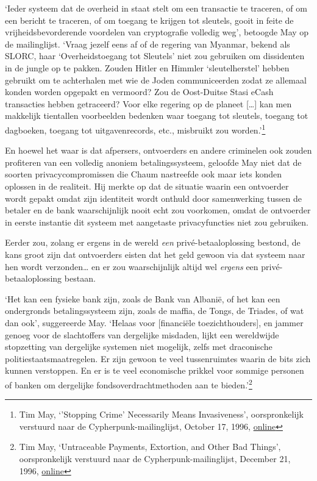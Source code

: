 \documentclass[
  a5paper,
  smalldemyvopaper,11pt,twoside,onecolumn,openright,extrafontsizes,
hidelinks]{memoir}
\begin{document}
`Ieder systeem dat de overheid in staat stelt om een transactie te
traceren, of om een bericht te traceren, of om toegang te krijgen tot
sleutels, gooit in feite de vrijheidsbevorderende voordelen van
cryptografie volledig weg', betoogde May op de mailinglijst. `Vraag
jezelf eens af of de regering van Myanmar, bekend als SLORC, haar
`Overheidstoegang tot Sleutels' niet zou gebruiken om dissidenten in de
jungle op te pakken. Zouden Hitler en Himmler `sleutelherstel' hebben
gebruikt om te achterhalen met wie de Joden communiceerden zodat ze
allemaal konden worden opgepakt en vermoord? Zou de Oost-Duitse Stasi
eCash transacties hebben getraceerd? Voor elke regering op de planeet
{[}\ldots{]} kan men makkelijk tientallen voorbeelden bedenken waar
toegang tot sleutels, toegang tot dagboeken, toegang tot
uitgavenrecords, etc., misbruikt zou worden.'\footnote{Tim May,
  `'Stopping Crime' Necessarily Means Invasiveness', oorspronkelijk
  verstuurd naar de Cypherpunk-mailinglijst, October 17, 1996,
  \href{https://cypherpunks.venona.com/date/1996/10/msg01269.html}{online}}

En hoewel het waar is dat afpersers, ontvoerders en andere criminelen
ook zouden profiteren van een volledig anoniem betalingssysteem,
geloofde May niet dat de soorten privacycompromissen die Chaum
nastreefde ook maar iets konden oplossen in de realiteit. Hij merkte op
dat de situatie waarin een ontvoerder wordt gepakt omdat zijn identiteit
wordt onthuld door samenwerking tussen de betaler en de bank
waarschijnlijk nooit echt zou voorkomen, omdat de ontvoerder in eerste
instantie dit systeem met aangetaste privacyfuncties niet zou gebruiken.

Eerder zou, zolang er ergens in de wereld \emph{een}
privé-betaaloplossing bestond, de kans groot zijn dat ontvoerders eisten
dat het geld gewoon via dat systeem naar hen wordt verzonden\ldots{} en
er zou waarschijnlijk altijd wel \emph{ergens} een privé-betaaloplossing
bestaan.

`Het kan een fysieke bank zijn, zoals de Bank van Albanië, of het kan
een ondergronds betalingssysteem zijn, zoals de maffia, de Tongs, de
Triades, of wat dan ook', suggereerde May. `Helaas voor {[}financiële
toezichthouders{]}, en jammer genoeg voor de slachtoffers van dergelijke
misdaden, lijkt een wereldwijde stopzetting van dergelijke systemen niet
mogelijk, zelfs met draconische politiestaatsmaatregelen. Er zijn gewoon
te veel tussenruimtes waarin de bits zich kunnen verstoppen. En er is te
veel economische prikkel voor sommige personen of banken om dergelijke
fondsoverdrachtmethoden aan te bieden.'\footnote{Tim May, `Untraceable
  Payments, Extortion, and Other Bad Things', oorspronkelijk verstuurd
  naar de Cypherpunk-mailinglijst, December 21, 1996,
  \href{https://cypherpunks.venona.com/date/1996/12/msg01468.html}{online}}
\end{document}
